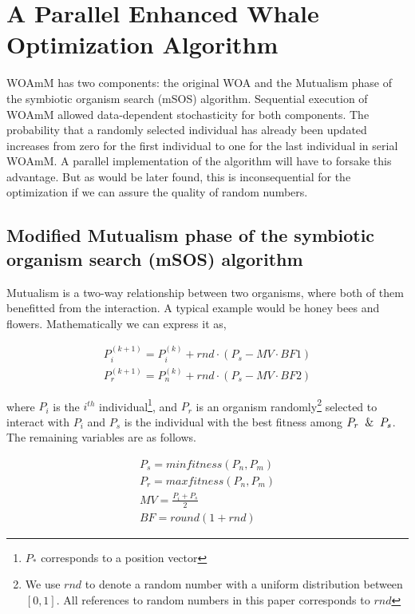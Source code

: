 \documentclass[conference]{IEEEtran}
\begin{document}
\section{A Parallel Enhanced Whale Optimization Algorithm}

WOAmM has two components: 
the original WOA and the Mutualism phase of the symbiotic organism search (mSOS) algorithm. 
Sequential execution of WOAmM allowed data-dependent stochasticity for both components. 
The probability that a randomly selected individual has already been updated increases from zero for the first individual to one for the last individual in serial WOAmM. 
A parallel implementation of the algorithm will have to forsake this advantage. 
But as would be later found, this is inconsequential for the optimization if we can assure the quality of random numbers.

\subsection{Modified Mutualism phase of the symbiotic organism search (mSOS) algorithm}

Mutualism is a two-way relationship between two organisms, where both of them benefitted from the interaction. 
A typical example would be honey bees and flowers. 
Mathematically we can express it as,

\setlength{\arraycolsep}{0.0em}
\begin{eqnarray}
    P^{(k+1)}_i= P^{(k)}_i+rnd\cdot(P_s - MV\cdot BF1)\\
    P^{(k+1)}_r= P^{(k)}_n+rnd\cdot(P_s - MV\cdot BF2)
\end{eqnarray}
\setlength{\arraycolsep}{0pt}

where $P_i$ is the $i^{th}$ individual\footnote{$P_*$ corresponds to a position vector}, and $P_r$ is an organism randomly\footnote{We use $rnd$ to denote a random number with a uniform distribution between $[0, 1]$. All references to random numbers in this paper corresponds to $rnd$} selected to interact with $P_i$ and $P_s$ is the individual with the best fitness among $P_r \And P_s$. 
The remaining variables are as follows.

\setlength{\arraycolsep}{0em}
\begin{eqnarray}
    P_s=min fitness(P_n,P_m) \\
    P_r=max fitness(P_n,P_m) \\
    MV = \frac{P_i+P_s}{2} \\
    BF = round(1+rnd)
\end{eqnarray}
\setlength{\arraycolsep}{0pt}
\end{document}
